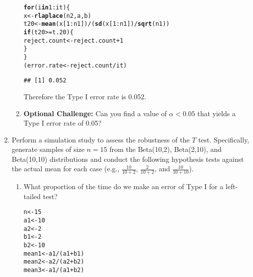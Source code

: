 \documentclass{article}\usepackage[]{graphicx}\usepackage[]{xcolor}
\makeatletter
\newcommand{\hlnum}[1]{\textcolor[rgb]{0.686,0.059,0.569}{#1}}%
\newcommand{\hlopt}[1]{\textcolor[rgb]{0,0,0}{#1}}%
\newcommand{\hldef}[1]{\textcolor[rgb]{0.345,0.345,0.345}{#1}}%
\newcommand{\hlkwa}[1]{\textcolor[rgb]{0.161,0.373,0.58}{\textbf{#1}}}%
\newcommand{\hlkwb}[1]{\textcolor[rgb]{0.69,0.353,0.396}{#1}}%
\newcommand{\hlkwd}[1]{\textcolor[rgb]{0.737,0.353,0.396}{\textbf{#1}}}%
\newenvironment{kframe}{%
 \def\at@end@of@kframe{}%
 \ifinner\ifhmode%
  \def\at@end@of@kframe{\end{minipage}}%
  \begin{minipage}{\columnwidth}%
 \fi\fi%
 \def\FrameCommand##1{\hskip\@totalleftmargin \hskip-\fboxsep
 \colorbox{shadecolor}{##1}\hskip-\fboxsep
     \hskip-\linewidth \hskip-\@totalleftmargin \hskip\columnwidth}%
 \MakeFramed {\advance\hsize-\width
   \@totalleftmargin\z@ \linewidth\hsize
   \@setminipage}}%
 {\par\unskip\endMakeFramed%
 \at@end@of@kframe}
\newenvironment{knitrout}{}{} %
\makeatother
\begin{document}
\begin{enumerate}
\begin{enumerate}
\begin{knitrout}
\begin{kframe}
\begin{alltt}
\hlkwa{for}\hldef{(i} \hlkwa{in} \hlnum{1}\hlopt{:}\hldef{it)\{}
  \hldef{x} \hlkwb{<-} \hlkwd{rlaplace}\hldef{(n2, a, b)}
  \hldef{t20} \hlkwb{<-} \hlkwd{mean}\hldef{(x[}\hlnum{1}\hlopt{:}\hldef{n1])}\hlopt{/}\hldef{(}\hlkwd{sd}\hldef{(x[}\hlnum{1}\hlopt{:}\hldef{n1])}\hlopt{/}\hlkwd{sqrt}\hldef{(n1))}
  \hlkwa{if}\hldef{(t20} \hlopt{>=} \hldef{t.20)\{}
    \hldef{reject.count} \hlkwb{<-} \hldef{reject.count} \hlopt{+} \hlnum{1}
  \hldef{\}}
\hldef{\}}
\hldef{(error.rate} \hlkwb{<-} \hldef{reject.count} \hlopt{/} \hldef{it)}
\end{alltt}
\begin{verbatim}
## [1] 0.052
\end{verbatim}
\end{kframe}
\end{knitrout}
Therefore the Type I error rate is 0.052.
  \item \textbf{Optional Challenge:} Can you find a value of $\alpha<0.05$ that yields a 
  Type I error rate of 0.05?
\end{enumerate}
  \item Perform a simulation study to assess the robustness of the $T$ test. 
  Specifically, generate samples of size $n=15$ from the Beta(10,2), Beta(2,10), 
  and Beta(10,10) distributions and conduct the following hypothesis tests against 
  the actual mean for each case (e.g., $\frac{10}{10+2}$, $\frac{2}{10+2}$, and 
  $\frac{10}{10+10}$). 
  \begin{enumerate}
    \item What proportion of the time do we make an error of Type I for a
    left-tailed test?
\begin{knitrout}\scriptsize
{}\color{fgcolor}\begin{kframe}
\begin{alltt}
\hldef{n} \hlkwb{<-} \hlnum{15}
\hldef{a1} \hlkwb{<-} \hlnum{10}
\hldef{a2} \hlkwb{<-} \hlnum{2}
\hldef{b1} \hlkwb{<-} \hlnum{2}
\hldef{b2} \hlkwb{<-} \hlnum{10}
\hldef{mean1} \hlkwb{<-} \hldef{a1}\hlopt{/}\hldef{(a1}\hlopt{+}\hldef{b1)}
\hldef{mean2} \hlkwb{<-} \hldef{a2}\hlopt{/}\hldef{(a2}\hlopt{+}\hldef{b2)}
\hldef{mean3} \hlkwb{<-} \hldef{a1}\hlopt{/}\hldef{(a1}\hlopt{+}\hldef{b2)}

\end{alltt}
\end{kframe}
\end{knitrout}
\end{enumerate}
\end{enumerate}
\end{document}
